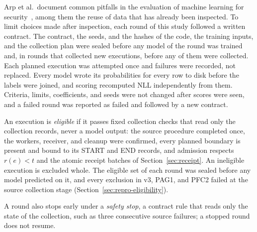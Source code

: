 Arp et al.\ document common pitfalls in the evaluation of machine
learning for security~\cite{arp2020dos}, among them the reuse of data
that has already been inspected.
To limit choices made after inspection,
each round of this study followed a written contract. The contract, the
seeds, and the hashes of the code, the training inputs, and the
collection plan were sealed before any model of the round was trained
and, in rounds that collected new executions, before any of them were
collected. Each planned execution was attempted once and failures were
recorded, not replaced. Every model wrote its probabilities for every
row to disk before the labels were joined, and scoring recomputed NLL
independently from them. Criteria, limits, coefficients, and seeds were
not changed after scores were seen, and a failed round was reported as
failed and followed by a new contract.

An execution is \emph{eligible} if it passes fixed collection checks
that read only the collection records, never a model output: the source
procedure completed once, the workers, receiver, and cleanup were
confirmed, every planned boundary is present and bound to its START and
END records, and admission respects $r(e)<t$ and the atomic receipt
batches of Section~\ref{sec:receipt}. An ineligible execution is
excluded whole. The eligible set of each round was sealed before any
model predicted on it, and every exclusion in v3, PAG1, and PFC2
failed at the source collection stage (Section~\ref{sec:repro-eligibility}).

A round also stops early under a \emph{safety stop}, a contract rule
that reads only the state of the collection, such as three consecutive
source failures; a stopped round does not resume.

